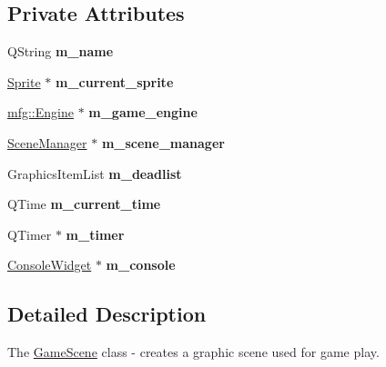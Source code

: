 \subsection*{Private Attributes}
\begin{DoxyCompactItemize}
\item 
\mbox{\label{class_game_scene_a962b8138354a26715c566c51766dba50}} 
Q\+String {\bfseries m\+\_\+name}
\item 
\mbox{\label{class_game_scene_a028e0e563ec3bd30a9afb606ef75e9f7}} 
\hyperlink{class_sprite}{Sprite} $\ast$ {\bfseries m\+\_\+current\+\_\+sprite}
\item 
\mbox{\label{class_game_scene_ad2ccaf177a7647a85c3a7cdbdd646fb8}} 
\hyperlink{classmfg_1_1_engine}{mfg\+::\+Engine} $\ast$ {\bfseries m\+\_\+game\+\_\+engine}
\item 
\mbox{\label{class_game_scene_a9caa2f44e6b54ab2e2e1278856b05503}} 
\hyperlink{class_scene_manager}{Scene\+Manager} $\ast$ {\bfseries m\+\_\+scene\+\_\+manager}
\item 
\mbox{\label{class_game_scene_af7f8cdc994102b36ddf0e6cf473859e2}} 
Graphics\+Item\+List {\bfseries m\+\_\+deadlist}
\item 
\mbox{\label{class_game_scene_afd3b6181bf71e4928c819cef61d3e246}} 
Q\+Time {\bfseries m\+\_\+current\+\_\+time}
\item 
\mbox{\label{class_game_scene_a46a12d66c156b32129df54d08e4afea8}} 
Q\+Timer $\ast$ {\bfseries m\+\_\+timer}
\item 
\mbox{\label{class_game_scene_abda4ce287b680ead5be56d31712d6d17}} 
\hyperlink{class_console_widget}{Console\+Widget} $\ast$ {\bfseries m\+\_\+console}
\end{DoxyCompactItemize}


\subsection{Detailed Description}
The \hyperlink{class_game_scene}{Game\+Scene} class -\/ creates a graphic scene used for game play. 


